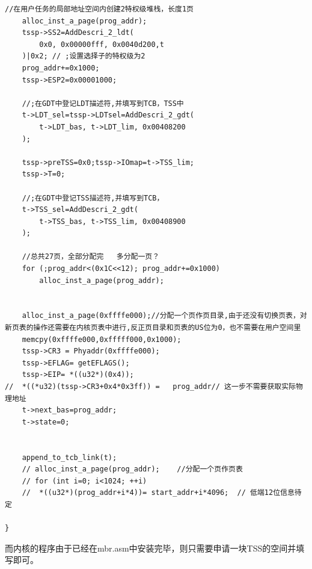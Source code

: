 \documentclass[a4paper,11pt,UTF8]{ctexart}
\begin{document}
\begin{lstlisting}[language={[ANSI]C},keywordstyle=\color{blue!70},commentstyle=\color{red!50!green!50!blue!50},frame=shadowbox, rulesepcolor=\color{red!20!green!20!blue!20}]
	//在用户任务的局部地址空间内创建2特权级堆栈，长度1页
	alloc_inst_a_page(prog_addr);
	tssp->SS2=AddDescri_2_ldt(
		0x0, 0x00000fff, 0x0040d200,t
	)|0x2; // ;设置选择子的特权级为2
	prog_addr+=0x1000;
	tssp->ESP2=0x00001000;

	//;在GDT中登记LDT描述符,并填写到TCB，TSS中
	t->LDT_sel=tssp->LDTsel=AddDescri_2_gdt(
		t->LDT_bas, t->LDT_lim, 0x00408200
	);
	
	tssp->preTSS=0x0;tssp->IOmap=t->TSS_lim;
	tssp->T=0;

	//;在GDT中登记TSS描述符,并填写到TCB，
	t->TSS_sel=AddDescri_2_gdt(
		t->TSS_bas, t->TSS_lim, 0x00408900
	);
	
	//总共27页，全部分配完	多分配一页？
	for (;prog_addr<(0x1C<<12); prog_addr+=0x1000)
		alloc_inst_a_page(prog_addr);
	

	alloc_inst_a_page(0xffffe000);//分配一个页作页目录,由于还没有切换页表，对新页表的操作还需要在内核页表中进行,反正页目录和页表的US位为0，也不需要在用户空间里
	memcpy(0xffffe000,0xfffff000,0x1000);
	tssp->CR3 = Phyaddr(0xffffe000);
	tssp->EFLAG= getEFLAGS();
	tssp->EIP= *((u32*)(0x4));
//	*((*u32)(tssp->CR3+0x4*0x3ff)) =   prog_addr// 这一步不需要获取实际物理地址
	t->next_bas=prog_addr;
	t->state=0;
	

	append_to_tcb_link(t);
	// alloc_inst_a_page(prog_addr);	//分配一个页作页表
	// for (int i=0; i<1024; ++i)
	// 	*((u32*)(prog_addr+i*4))= start_addr+i*4096;  // 低端12位信息待定

}

	\end{lstlisting}
	而内核的程序由于已经在mbr.asm中安装完毕，则只需要申请一块TSS的空间并填写即可。
\end{document}
